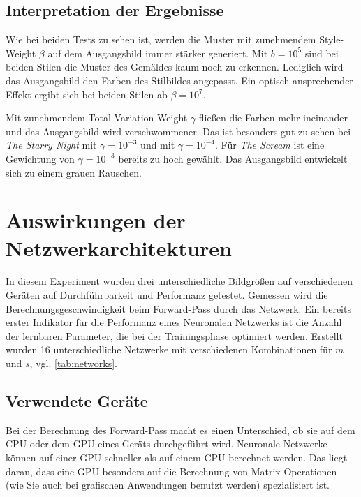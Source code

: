 \pagebreak

\subsection{Interpretation der Ergebnisse}

Wie bei beiden Tests zu sehen ist, werden die Muster mit zunehmendem Style-Weight $ \beta $ auf dem Ausgangsbild immer stärker generiert. Mit $ b = 10^{5} $ sind bei beiden Stilen die Muster des Gemäldes kaum noch zu erkennen. Lediglich wird das Ausgangsbild den Farben des Stilbildes angepasst. Ein optisch ansprechender Effekt ergibt sich bei beiden Stilen ab $ \beta = 10^{7} $. 

Mit zunehmendem Total-Variation-Weight $ \gamma $ fließen die Farben mehr ineinander und das Ausgangsbild wird verschwommener. Das ist besonders gut zu sehen bei \textit{The Starry Night} mit $ \gamma = 10^{-3} $ und  mit $ \gamma = 10^{-4} $. Für \textit{The Scream} ist eine Gewichtung von $ \gamma = 10^{-3} $ bereits zu hoch gewählt. Das Ausgangsbild entwickelt sich zu einem grauen Rauschen.


\section{Auswirkungen der Netzwerkarchitekturen}

In diesem Experiment wurden drei unterschiedliche Bildgrößen auf verschiedenen Geräten auf Durchführbarkeit und Performanz getestet.
Gemessen wird die Berechnungsgeschwindigkeit beim Forward-Pass durch das Netzwerk. Ein bereits erster Indikator für die Performanz eines Neuronalen Netzwerks ist die Anzahl der lernbaren Parameter, die bei der Trainingsphase optimiert werden. Erstellt wurden 16 unterschiedliche Netzwerke mit verschiedenen Kombinationen für $ m $ und $ s $, vgl. \ref{tab:networks}. 

\subsection{Verwendete Geräte}

Bei der Berechnung des Forward-Pass macht es einen Unterschied, ob sie auf dem CPU oder dem GPU eines Geräts durchgeführt wird. Neuronale Netzwerke können auf einer GPU schneller als auf einem CPU berechnet werden. Das liegt daran, dass eine GPU besonders auf die Berechnung von Matrix-Operationen (wie Sie auch bei grafischen Anwendungen benutzt werden) spezialisiert ist.

